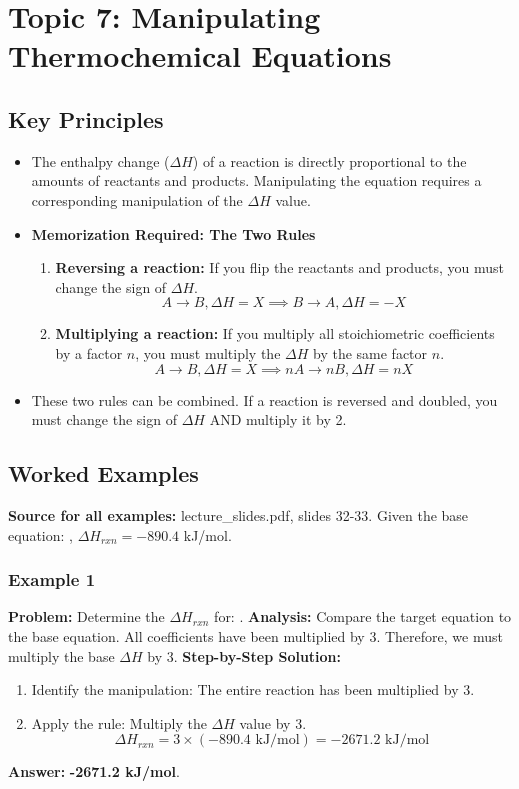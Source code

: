 \documentclass{article}
\begin{document}
\section{Topic 7: Manipulating Thermochemical Equations}
\subsection{Key Principles}
\begin{itemize}
    \item The enthalpy change ($\Delta H$) of a reaction is directly proportional to the amounts of reactants and products. Manipulating the equation requires a corresponding manipulation of the $\Delta H$ value.
    \item \textbf{Memorization Required: The Two Rules}
        \begin{enumerate}
            \item \textbf{Reversing a reaction:} If you flip the reactants and products, you must change the sign of $\Delta H$.
            \[ A \rightarrow B, \Delta H = X \implies B \rightarrow A, \Delta H = -X \]
            \item \textbf{Multiplying a reaction:} If you multiply all stoichiometric coefficients by a factor $n$, you must multiply the $\Delta H$ by the same factor $n$.
            \[ A \rightarrow B, \Delta H = X \implies nA \rightarrow nB, \Delta H = nX \]
        \end{enumerate}
    \item These two rules can be combined. If a reaction is reversed and doubled, you must change the sign of $\Delta H$ AND multiply it by 2.
\end{itemize}

\subsection{Worked Examples}
\textbf{Source for all examples:} lecture\_slides.pdf, slides 32-33.
Given the base equation: , $\Delta H_{rxn} = -890.4$ kJ/mol.

\subsubsection{Example 1}
\textbf{Problem:} Determine the $\Delta H_{rxn}$ for: .
\textbf{Analysis:} Compare the target equation to the base equation. All coefficients have been multiplied by 3. Therefore, we must multiply the base $\Delta H$ by 3.
\textbf{Step-by-Step Solution:}
\begin{enumerate}
    \item Identify the manipulation: The entire reaction has been multiplied by 3.
    \item Apply the rule: Multiply the $\Delta H$ value by 3.
    \[ \Delta H_{rxn} = 3 \times (-890.4 \text{ kJ/mol}) = -2671.2 \text{ kJ/mol} \]
\end{enumerate}
\textbf{Answer:} \textbf{-2671.2 kJ/mol}.
\end{document}
